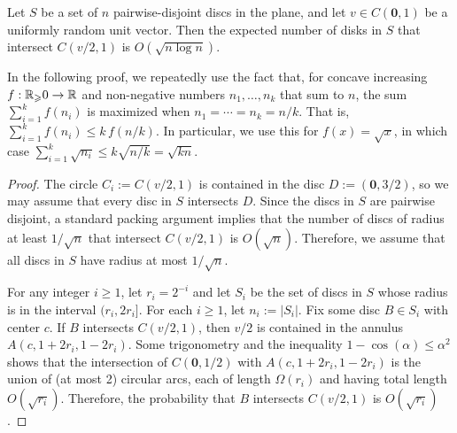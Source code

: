 \documentclass{patmorin}
\renewcommand{\ge}{\geqslant}
\renewcommand{\le}{\leqslant}
\begin{document}
\begin{lem}
  Let $S$ be a set of $n$ pairwise-disjoint discs in the plane, and let $v\in C(\mathbf{0},1)$ be a uniformly random unit vector.  Then the expected number of disks in $S$ that intersect $C(v/2,1)$ is $O(\sqrt{n\log n})$.
\end{lem}

In the following proof, we repeatedly use the fact that, for concave increasing $f:\R_\ge 0\to\R$ and non-negative numbers $n_1,\ldots,n_k$ that sum to $n$, the sum $\sum_{i=1}^k f(n_i)$ is maximized when $n_1=\cdots=n_k=n/k$.  That is, $\sum_{i=1}^k f(n_i) \le k\,f(n/k)$.  In particular, we use this for $f(x)=\sqrt{x}$, in which case $\sum_{i=1}^k \sqrt{n_i}\le k\sqrt{n/k}=\sqrt{kn}$.

\begin{proof}
  The circle $C_i:=C(v/2,1)$ is contained in the disc $D:=(\mathbf{0},3/2)$, so we may assume that every disc in $S$ intersects $D$.  Since the discs in $S$ are pairwise disjoint, a standard packing argument implies that the number of discs of radius at least $1/\sqrt{n}$ that intersect $C(v/2,1)$ is $O(\sqrt{n})$. Therefore, we assume that all discs in $S$ have radius at most $1/\sqrt{n}$.

  For any integer $i\ge 1$, let $r_i=2^{-i}$ and let $S_i$ be the set of discs in $S$ whose radius is in the interval $(r_i,2r_i]$. For each $i\ge 1$, let $n_i:=|S_i|$. Fix some disc $B\in S_i$ with center $c$.  If $B$ intersects $C(v/2,1)$, then $v/2$ is contained in the annulus $A(c,1+2r_i,1-2r_i)$.  Some trigonometry and the inequality $1-\cos(\alpha)\le \alpha^2$ shows that the intersection of $C(\mathbf{0},1/2)$ with $A(c,1+2r_i,1-2r_i)$ is the union of (at most 2) circular arcs, each of length $\Omega(r_i)$ and having total length  $O(\sqrt{r_i})$. Therefore, the probability that $B$ intersects $C(v/2,1)$ is $O(\sqrt{r_i})$.



\end{proof}
\end{document}
